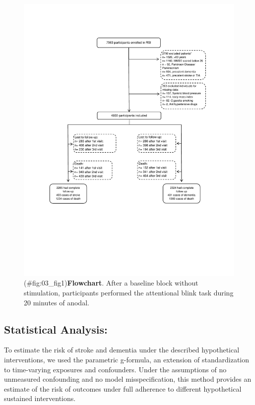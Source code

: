 \documentclass[
]{book}
\begin{document}
\begin{figure}
\centering
\includegraphics{figs/03_fig1.pdf}
\caption{(\#fig:03\_fig1)\textbf{Flowchart}. After a baseline block without stimulation, participants performed the attentional blink task during 20 minutes of anodal.}
\end{figure}



\hypertarget{statistical-analysis}{%
\subsection{Statistical Analysis:}\label{statistical-analysis}}

To estimate the risk of stroke and dementia under the described hypothetical interventions, we used the parametric g-formula, an extension of standardization to time-varying exposures and confounders. Under the assumptions of no unmeasured confounding and no model misspecification, this method provides an estimate of the risk of outcomes under full adherence to different hypothetical sustained interventions\autocite{taubman2009,garcia_aymerich2014,danaei_epid2013,vangenlonne2018,dickerman2019}.
\end{document}
